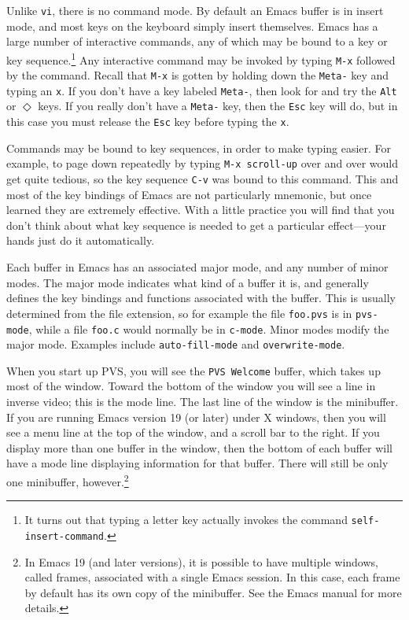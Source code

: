 Unlike \texttt{vi}, there is no command mode.  By default an Emacs buffer
is in insert mode, and most keys on the keyboard simply insert themselves.
Emacs has a large number of interactive commands, any of which may be
bound to a key or key sequence.\footnote{It turns out that typing a letter
key actually invokes the command \texttt{self-insert-command}.}  Any
interactive command may be invoked by typing \texttt{M-x} followed by the
command.  Recall that \texttt{M-x} is gotten by holding down the
\texttt{Meta-} key and typing an \texttt{x}.  If you don't have a key
labeled \texttt{Meta-}, then look for and try the \texttt{Alt} or
$\Diamond$ keys.  If you really don't have a \texttt{Meta-} key, then the
\texttt{Esc} key will do, but in this case you must release the
\texttt{Esc} key before typing the \texttt{x}.

Commands may be bound to key sequences, in order to make typing easier.
For example, to page down repeatedly by typing \texttt{M-x
scroll-up} over and over would get quite tedious, so the key sequence
\texttt{C-v} was bound to this command.  This and most of the key bindings
of Emacs are not particularly mnemonic, but once learned they are
extremely effective.  With a little practice you will find that you don't
think about what key sequence is needed to get a particular effect---your
hands just do it automatically.

Each buffer in Emacs has an associated major mode, and any number of minor
modes.  The major mode indicates what kind of a buffer it is, and
generally defines the key bindings and functions associated with the
buffer.  This is usually determined from the file extension, so for
example the file \texttt{foo.pvs} is in \texttt{pvs-mode}, while a file
\texttt{foo.c} would normally be in \texttt{c-mode}.  Minor modes modify
the major mode.  Examples include \texttt{auto-fill-mode} and
\texttt{overwrite-mode}.

When you start up PVS, you will see the \texttt{PVS Welcome} buffer, which
takes up most of the window.  Toward the bottom of the window you will see
a line in inverse video; this is the mode line.  The last line of the
window is the minibuffer.  If you are running Emacs version 19 (or later) under X
windows, then you will see a menu line at the top of the window, and a
scroll bar to the right.  If you display more than one buffer in the
window, then the bottom of each buffer will have a mode line displaying
information for that buffer.  There will still be only one minibuffer,
however.\footnote{In Emacs 19 (and later versions), it is possible to have multiple windows,
called frames, associated with a single Emacs session.  In this case, each
frame by default has its own copy of the minibuffer.  See the Emacs manual
for more details.}

